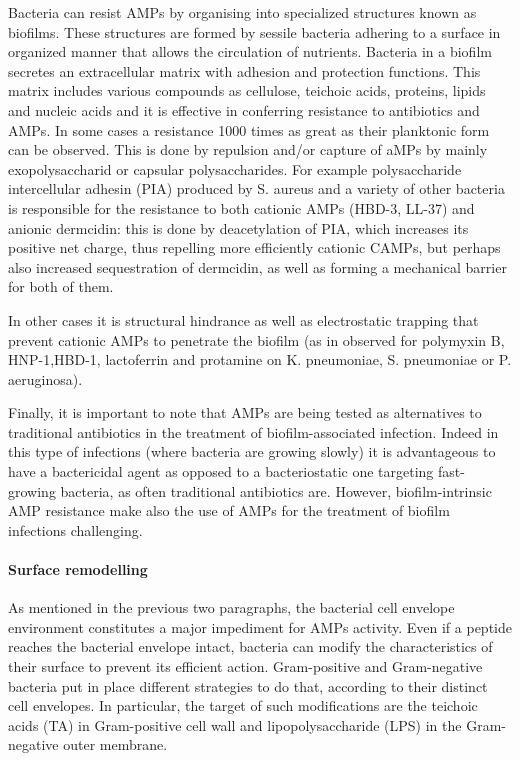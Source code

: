 \documentclass[a4paper,11pt]{extreport}
\begin{document}
Bacteria can resist AMPs by organising into specialized structures known as biofilms. These structures are formed by sessile bacteria adhering to a surface in organized manner that allows the circulation of nutrients.\cite{Costerton1999}
Bacteria in a biofilm secretes an extracellular matrix with adhesion and protection functions. This matrix includes various compounds as cellulose, teichoic acids, proteins, lipids and nucleic acids\cite{Jolivet-Gougeon2014}
and it is effective in conferring resistance to antibiotics and AMPs. In some cases a resistance 1000 times as great as their planktonic form can be observed.\cite{Nickel1985,Mah2001}
This is done by repulsion and/or capture of aMPs by mainly exopolysaccharid or capsular polysaccharides.
%
For example polysaccharide intercellular adhesin (PIA) produced by S. aureus and a variety of other bacteria is responsible for the resistance to both cationic AMPs (HBD-3, LL-37) and anionic dermcidin:\cite{Wang2004,Vuong2004}
this is done by deacetylation of PIA, which increases its positive net charge, thus repelling more efficiently cationic CAMPs, but perhaps also increased sequestration of dermcidin, as well as forming a mechanical barrier for both of them.\cite{Vuong2004}

In other cases it is structural hindrance as well as electrostatic trapping that prevent cationic AMPs to penetrate the biofilm (as in observed for polymyxin B, HNP-1,HBD-1, lactoferrin and protamine on K. pneumoniae, S. pneumoniae or P. aeruginosa).\cite{Campos2004,Llobet2008}

Finally, it is important to note that AMPs are being tested as alternatives to traditional antibiotics in the treatment of biofilm-associated infection. Indeed in this type of infections (where bacteria are growing slowly) it is advantageous to have a bactericidal agent as opposed to a bacteriostatic one targeting fast-growing bacteria, as often traditional antibiotics are.\cite{Batoni2011,Strempel2014}
However, biofilm-intrinsic AMP resistance make also the use of AMPs for the treatment of biofilm infections challenging.\cite{Joo2012,DiLuca2014}

\paragraph{Surface remodelling}
As mentioned in the previous two paragraphs, the bacterial cell envelope environment constitutes a major impediment for AMPs activity.
%
Even if a peptide reaches the bacterial envelope intact, bacteria can modify the characteristics of their surface to prevent its efficient action.
%
Gram-positive and Gram-negative bacteria put in place different strategies to do that, according to their distinct cell envelopes.
%
In particular, the target of such modifications are the teichoic acids (TA) in Gram-positive cell wall and lipopolysaccharide (LPS) in the Gram-negative outer membrane.
\end{document}
